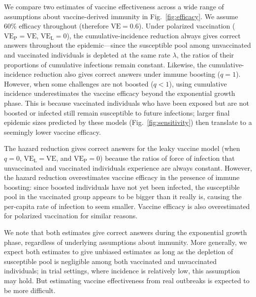 \documentclass[12pt]{article}
\newcommand{\fref}[1]{Fig.~\ref{fig:#1}}
\newcommand{\VE}{\ensuremath{\mathrm{VE}}}
\newcommand{\VEP}{\ensuremath{\VE_{\mathrm{P}}}}
\newcommand{\VEL}{\ensuremath{\VE_{\mathrm{L}}}}
\begin{document}
We compare two estimates of vaccine effectiveness across a wide range of assumptions about vaccine-derived immunity in \fref{efficacy}.
We assume 60\% efficacy throughout (therefore $\VE = 0.6$).
Under polarized vaccination ($\VEP=\VE$, $\VEL=0$), the cumulative-incidence reduction always gives correct answers throughout the epidemic---since the susceptible pool among unvaccinated and vaccinated individuals is depleted at the same rate $\lambda$, the ratios of their proportions of cumulative infections remain constant.
Likewise, the cumulative-incidence reduction also gives correct answers under immune boosting ($q=1$).
However, when some challenges are not boosted ($q < 1$), using cumulative incidence underestimates the vaccine efficacy beyond the exponential growth phase.
This is because vaccinated individuals who have been exposed but are not boosted or infected still remain susceptible to future infections; 
larger final epidemic sizes predicted by these models (\fref{sensitivity}) then translate to a seemingly lower vaccine efficacy.

The hazard reduction gives correct answers for the leaky vaccine model (when $q=0$, $\VEL = \VE$, and $\VEP = 0$) because the ratios of force of infection that unvaccinated and vaccinated individuals experience are always constant.
However, the hazard reduction overestimates vaccine efficacy in the presence of immune boosting: since boosted individuals have not yet been infected, the susceptible pool in the vaccinated group appears to be bigger than it really is, causing the per-capita rate of infection to seem smaller.
Vaccine efficacy is also overestimated for polarized vaccination for similar reasons.

We note that both estimates give correct answers during the exponential growth phase, regardless of underlying assumptions about immunity.
More generally, we expect both estimates to give unbiased estimates as long as the depletion of susceptible pool is negligible among both vaccinated and unvaccinated individuals;
in trial settings, where incidence is relatively low, this assumption may hold.
But estimating vaccine effectiveness from real outbreaks is expected to be more difficult.
\end{document}
